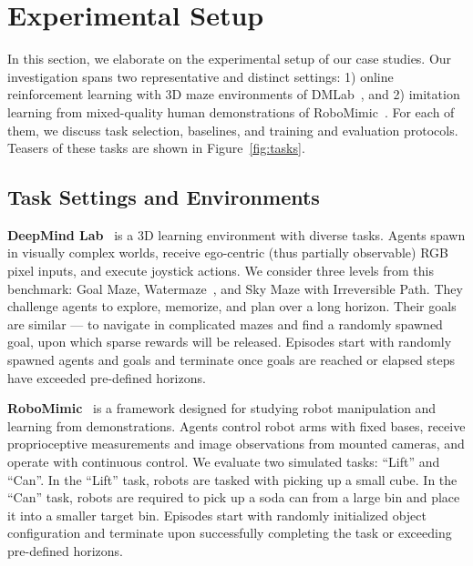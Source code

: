 \section{Experimental Setup}
\label{sec:exp_setup}

In this section, we elaborate on the experimental setup of our case studies. Our investigation spans two representative and distinct settings:
1) online reinforcement learning with 3D maze environments of DMLab~\citep{beattie2016deepmind}, and 2) imitation learning from mixed-quality human demonstrations of RoboMimic~\citep{mandlekar2021matters}. For each of them, we discuss task selection, baselines, and training and evaluation protocols.
Teasers of these tasks are shown in Figure~\ref{fig:tasks}.

\subsection{Task Settings and Environments}


\textbf{DeepMind Lab}~\citep{beattie2016deepmind} is a 3D learning environment with diverse tasks.
Agents spawn in visually complex worlds, receive ego-centric (thus partially observable) RGB pixel inputs, and execute joystick actions. We consider three levels from this benchmark: Goal Maze, Watermaze~\citep{watermaze}, and Sky Maze with Irreversible Path. They challenge agents to explore, memorize, and plan over a long horizon. Their goals are similar --- to navigate in complicated mazes and find a randomly spawned goal, upon which sparse rewards will be released.
Episodes start with randomly spawned agents and goals and terminate once goals are reached or elapsed steps have exceeded pre-defined horizons.

\textbf{RoboMimic}~\citep{mandlekar2021matters} is a framework designed for studying robot manipulation and learning from demonstrations. Agents control robot arms with fixed bases, receive proprioceptive measurements and image observations from mounted cameras, and operate with continuous control.
We evaluate two simulated tasks: ``Lift'' and ``Can''. In the ``Lift'' task, robots are tasked with picking up a small cube. In the ``Can'' task, robots are required to pick up a soda can from a large bin and place it into a smaller target bin.
Episodes start with randomly initialized object configuration and terminate upon successfully completing the task or exceeding pre-defined horizons.






